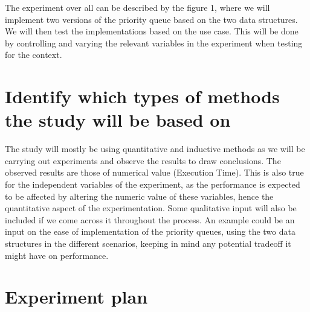 \documentclass[12pt]{article}
\begin{document}
The experiment over all can be described by the figure 1, where we will implement two versions of the priority queue based on the two data structures. We will then test the implementations based on the use case. This will be done by controlling and varying the relevant variables in the experiment when testing for the context. 

\section{Identify which types of methods the study will be based on}

The study will mostly be using quantitative and inductive methods as we will be carrying out experiments and observe the results to draw conclusions. The observed results are those of numerical value (Execution Time). This is also true for the independent variables of the experiment, as the performance is expected to be affected by altering the numeric value of these variables, hence the quantitative aspect of the experimentation. Some qualitative input will also be included if we come across it throughout the process. An example could be an input on the ease of implementation of the priority queues, using the two data structures in the different scenarios, keeping in mind any potential tradeoff it might have on performance.

\section{Experiment plan}
\end{document}
